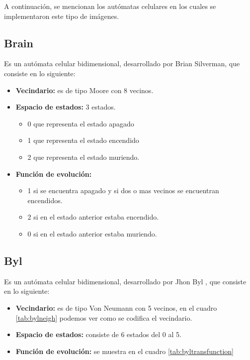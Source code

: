 A continuación, se mencionan los autómatas celulares en los cuales se implementaron este tipo de imágenes.

\subsection{Brain}

Es un autómata celular bidimensional, desarrollado por Brian Silverman, que consiste en lo siguiente:

\begin{itemize}
	\item \textbf{Vecindario:} es de tipo Moore con 8 vecinos.
	\item \textbf{Espacio de estados:} 3 estados.
	\begin{itemize}
		\item 0 que representa el estado apagado
		\item 1 que representa el estado encendido
		\item 2 que representa el estado muriendo.
	\end{itemize}
	\item \textbf{Función de evolución:} 
	\begin{itemize}
		\item 1 si se encuentra apagado y si dos o mas vecinos se encuentran encendidos.
		\item 2 si en el estado anterior estaba encendido.
		\item 0 si en el estado anterior estaba muriendo.
	\end{itemize}
\end{itemize}

\subsection{Byl}

Es un autómata celular bidimensional, desarrollado por Jhon Byl \citep{BYL1989295}, que consiste en lo siguiente:

\begin{itemize}
	\item \textbf{Vecindario:} es de tipo Von Neumann con 5 vecinos, en el cuadro \ref{tab:bylneigh} podemos ver como se codifica el vecindario.
	\item \textbf{Espacio de estados:} consiste de 6 estados del 0 al 5.
	\item \textbf{Función de evolución:} se muestra en el cuadro \ref{tab:byltransfunction}
\end{itemize}

